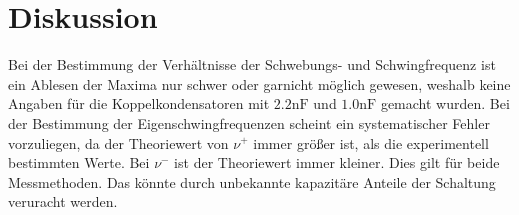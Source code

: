 \section{Diskussion}
\label{sec:Diskussion}
Bei der Bestimmung der Verhältnisse der Schwebungs- und Schwingfrequenz ist ein
Ablesen der Maxima nur schwer oder garnicht möglich gewesen, weshalb keine Angaben
für die Koppelkondensatoren mit $2.2\si{\nano\farad}$ und $1.0\si{\nano\farad}$
gemacht wurden.
Bei der Bestimmung der Eigenschwingfrequenzen scheint ein systematischer Fehler
vorzuliegen, da der Theoriewert von $\nu^{+}$ immer größer ist, als die experimentell
bestimmten Werte. Bei $\nu^{-}$ ist der Theoriewert immer kleiner. Dies gilt für
beide Messmethoden. Das könnte durch unbekannte kapazitäre Anteile der Schaltung
veruracht werden.
